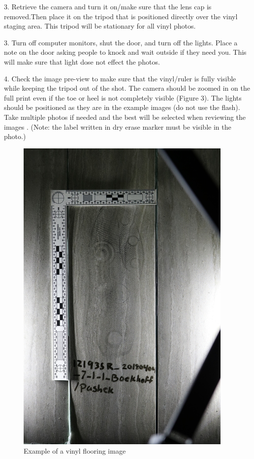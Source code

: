 \newpage

3. Retrieve the camera and turn it on/make sure that the lens cap is removed.Then place it on the tripod that is positioned directly over the vinyl staging area. This tripod will be stationary for all vinyl photos. 

3. Turn off computer monitors, shut the door, and turn off the lights. Place a note on the door asking people to knock and wait outside if they need you. This will make sure that light dose not effect the photos.

4. Check the image pre-view to make sure that the vinyl/ruler is fully visible while keeping the tripod out of the shot. The camera should be zoomed in on the full print even if the toe or heel is not completely visible (Figure 3). The lights should be positioned as they are in the example images (do not use the flash). Take multiple photos if needed and the best will be selected when reviewing the images . (Note: the label written in dry erase marker must be visible in the photo.) 


\begin{figure}[!htp]
\centering
\includegraphics[scale=0.3]{New_Vinyl}
\caption{Example of a vinyl flooring image}
\label{iFigure 3}
\end{figure}

